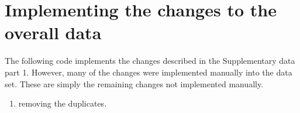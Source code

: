 \documentclass[]{elsarticle} %
\newenvironment{Shaded}{\begin{snugshade}}{\end{snugshade}}
\newcommand{\AttributeTok}[1]{\textcolor[rgb]{0.77,0.63,0.00}{#1}}
\newcommand{\FunctionTok}[1]{\textcolor[rgb]{0.00,0.00,0.00}{#1}}
\newcommand{\NormalTok}[1]{#1}
\newcommand{\OtherTok}[1]{\textcolor[rgb]{0.56,0.35,0.01}{#1}}
\newcommand{\SpecialCharTok}[1]{\textcolor[rgb]{0.00,0.00,0.00}{#1}}
\newcommand{\StringTok}[1]{\textcolor[rgb]{0.31,0.60,0.02}{#1}}
\providecommand{\tightlist}{%
  \setlength{\itemsep}{0pt}\setlength{\parskip}{0pt}}
\begin{document}
\begin{Shaded}
\end{Shaded}

\hypertarget{implementing-the-changes-to-the-overall-data}{%
\section{Implementing the changes to the overall data}\label{implementing-the-changes-to-the-overall-data}}

The following code implements the changes described in the Supplementary data part 1. However, many of the changes were implemented manually into the data set. These are simply the remaining changes not implemented manually.

\begin{enumerate}
\def\labelenumi{\arabic{enumi}.}
\tightlist
\item
  removing the duplicates.
\end{enumerate}
\end{document}

